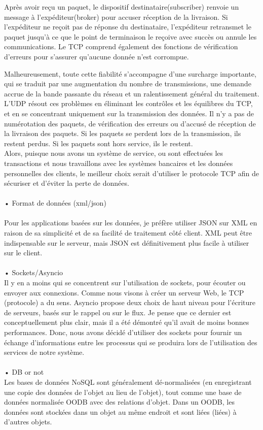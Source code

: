 Après avoir reçu un paquet, le dispositif destinataire(subscriber) renvoie un message à l’expéditeur(broker) pour accuser réception de la livraison. Si l’expéditeur ne reçoit pas de réponse du destinataire, l’expéditeur retransmet le paquet jusqu’à ce que le point de terminaison le reçoive avec succès ou annule les communications. Le TCP comprend également des fonctions de vérification d’erreurs pour s’assurer qu’aucune donnée n’est corrompue.

Malheureusement, toute cette fiabilité s’accompagne d’une surcharge importante, qui se traduit par une augmentation du nombre de transmissions, une demande accrue de la bande passante du réseau et un ralentissement général du traitement.
\\L’UDP résout ces problèmes en éliminant les contrôles et les équilibres du TCP, et en se concentrant uniquement sur la transmission des données. Il n’y a pas de numérotation des paquets, de vérification des erreurs ou d’accusé de réception de la livraison des paquets. Si les paquets se perdent lors de la transmission, ils restent perdus. Si les paquets sont hors service, ils le restent.
\\Alors, puisque nous avons un système de service, ou sont effectuées les transactions  et nous travaillons  avec les systèmes bancaires et les données personnelles des clients, le meilleur choix serait d'utiliser le protocole TCP afin de sécuriser et d'éviter la perte de données.\\
\\• Format de données (xml/json)\\\\
Pour les applications basées sur les données, je préfère utiliser JSON sur XML en raison de sa simplicité et de sa facilité de traitement côté client. XML peut être indispensable sur le serveur, mais JSON est définitivement plus facile à utiliser sur le client.\\
\\• Sockets/Asyncio\\
Il y en a moins qui se concentrent sur l'utilisation de sockets, pour écouter ou envoyer aux connexions. Comme nous visons à créer un serveur Web, le TCP (protocole) a du sens.
Asyncio propose deux choix de haut niveau pour l'écriture de serveurs, basés sur le rappel ou sur le flux. Je pense que ce dernier est conceptuellement plus clair, mais il a été démontré qu'il avait de moins bonnes performances.
Donc, nous avons décidé d'utiliser des sockets pour fournir un échange d'informations entre les processus qui se produira lors de l'utilisation des services de notre système.\\
\\• DB or not\\
Les bases de données NoSQL sont généralement dé-normalisées (en enregistrant une copie des données de l'objet au lieu de l'objet), tout comme une base de données normalisée OODB avec des relations d'objet. Dans un OODB, les données sont stockées dans un objet au même endroit et sont liées (liées) à d'autres objets.


